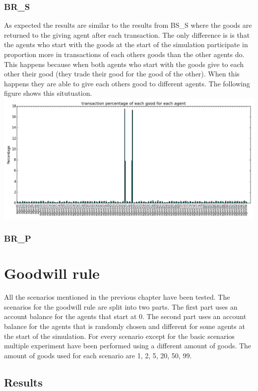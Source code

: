 \documentclass[twoside,openright]{uva-bachelor-thesis}
\begin{document}
\subsubsection{BR\_S}
As expected the results are similar to the results from BS\_S where the goods are returned to the giving agent after each transaction. The only difference is is that the agents who start with the goods at the start of the simulation participate in proportion more in transactions of each others goods than the other agents do. This happens because when both agents who start with the goods give to each other their good (they trade their good for the good of the other). When this happens they are able to give each others good to different agents. The following figure shows this situtuation. \\
\includegraphics[scale=0.4]{experiment_images/BR_S}


\subsubsection{BR\_P}

\section{Goodwill rule}
All the scenarios mentioned in the previous chapter have been tested. The scenarios for the goodwill rule are split into two parts. The first part uses an account balance for the agents that start at 0. The second part uses an account balance for the agents that is randomly chosen and different for some agents at the start of the simulation. For every scenario except for the basic scenarios multiple experiment have been performed using a different amount of goods. The amount of goods used for each scenario are 1, 2, 5, 20, 50, 99.
\subsection{Results}
\end{document}
